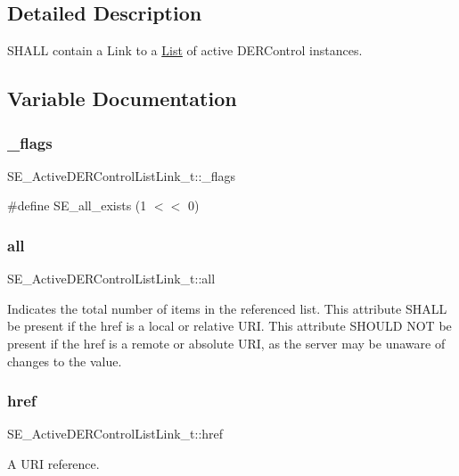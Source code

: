 \subsection{Detailed Description}
S\+H\+A\+LL contain a Link to a \hyperlink{structList}{List} of active D\+E\+R\+Control instances. 

\subsection{Variable Documentation}
\mbox{\label{group__ActiveDERControlListLink_gaeecb69aecac21e9415585eb108272309}} 
\subsubsection{\texorpdfstring{\+\_\+flags}{\_flags}}
{\footnotesize\ttfamily S\+E\+\_\+\+Active\+D\+E\+R\+Control\+List\+Link\+\_\+t\+::\+\_\+flags}

\#define S\+E\+\_\+all\+\_\+exists (1 $<$$<$ 0) \mbox{\label{group__ActiveDERControlListLink_ga5207254c0fefaa2e950d854bd911ede8}} 
\subsubsection{\texorpdfstring{all}{all}}
{\footnotesize\ttfamily S\+E\+\_\+\+Active\+D\+E\+R\+Control\+List\+Link\+\_\+t\+::all}

Indicates the total number of items in the referenced list. This attribute S\+H\+A\+LL be present if the href is a local or relative U\+RI. This attribute S\+H\+O\+U\+LD N\+OT be present if the href is a remote or absolute U\+RI, as the server may be unaware of changes to the value. \mbox{\label{group__ActiveDERControlListLink_gad2afedb20cb4a7d70e5fb38623cd10c7}} 
\subsubsection{\texorpdfstring{href}{href}}
{\footnotesize\ttfamily S\+E\+\_\+\+Active\+D\+E\+R\+Control\+List\+Link\+\_\+t\+::href}

A U\+RI reference. 